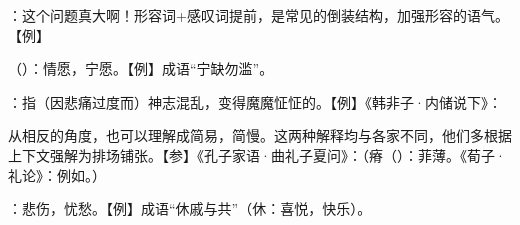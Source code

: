 {
\item {}：这个问题真大啊！形容词+感叹词提前，是常见的倒装结构，加强形容的语气。【例】 
\item {}（）：情愿，宁愿。【例】成语“宁缺勿滥”。
\item {}：指（因悲痛过度而）神志混乱，变得魔魔怔怔的。【例】《韩非子·内储说下》：

从相反的角度，也可以理解成简易，简慢。这两种解释均与各家不同，他们多根据上下文强解为排场铺张。【参】《孔子家语·曲礼子夏问》：（瘠（）：菲薄。《荀子·礼论》：例如。）
\item {}：悲伤，忧愁。【例】成语“休戚与共”（休：喜悦，快乐）。
}
{}


